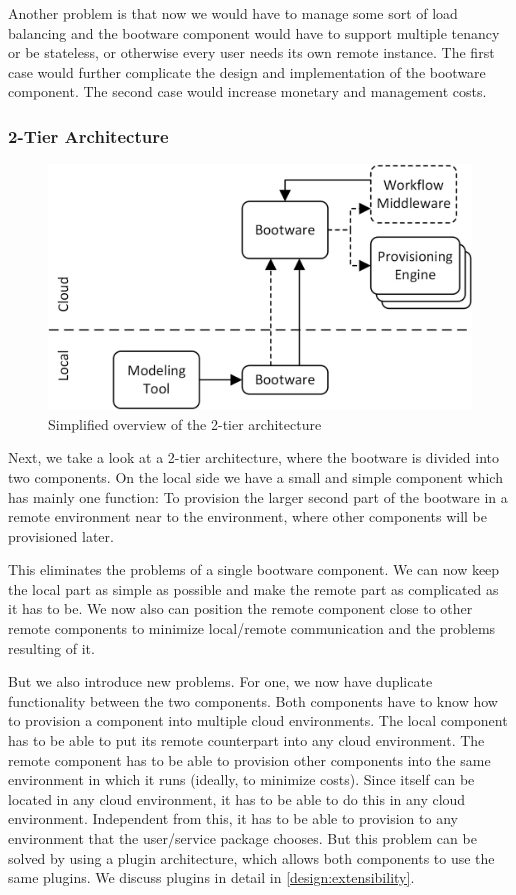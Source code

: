 Another problem is that now we would have to manage some sort of load balancing and the bootware component would have to support multiple tenancy or be stateless, or otherwise every user needs its own remote instance.
The first case would further complicate the design and implementation of the bootware component.
The second case would increase monetary and management costs.

\subsubsection{2-Tier Architecture}
\label{design:division:2tier}

\begin{figure}[!htbp]
	\centering
	\includegraphics[resolution=600]{design/assets/simple_2_tier}
	\caption{Simplified overview of the 2-tier architecture}
	\label{image:2_tier}
\end{figure}

Next, we take a look at a 2-tier architecture, where the bootware is divided into two components.
On the local side we have a small and simple component which has mainly one function: To provision the larger second part of the bootware in a remote environment near to the environment, where other components will be provisioned later.

This eliminates the problems of a single bootware component.
We can now keep the local part as simple as possible and make the remote part as complicated as it has to be.
We now also can position the remote component close to other remote components to minimize local/remote communication and the problems resulting of it.

But we also introduce new problems.
For one, we now have duplicate functionality between the two components.
Both components have to know how to provision a component into multiple cloud environments.
The local component has to be able to put its remote counterpart into any cloud environment.
The remote component has to be able to provision other components into the same environment in which it runs (ideally, to minimize costs).
Since itself can be located in any cloud environment, it has to be able to do this in any cloud environment.
Independent from this, it has to be able to provision to any environment that the user/service package chooses.
But this problem can be solved by using a plugin architecture, which allows both components to use the same plugins.
We discuss plugins in detail in \autoref{design:extensibility}.

